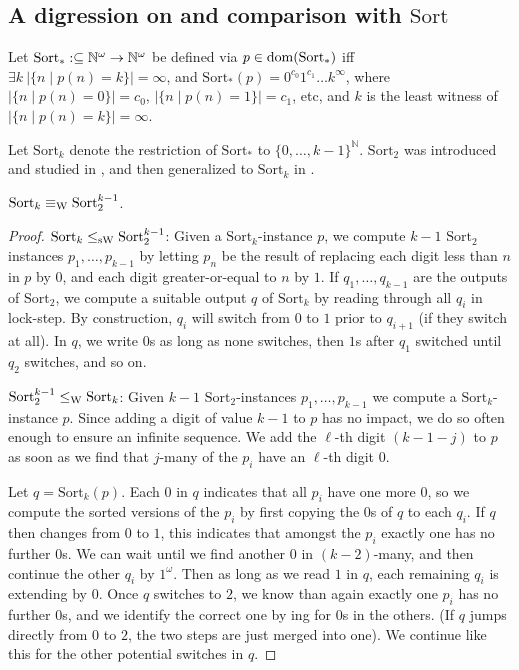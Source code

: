 \documentclass{eptcs-modified}
\begin{document}
\subsection{A digression on and comparison with $\mathrm{Sort}$}
\begin{definition}
Let $\mathrm{Sort}_* : \subseteq {\mathbb{N}^\omega} \to {\mathbb{N}^\omega}$ be defined via $p \in \operatorname{dom}(\mathrm{Sort}_*)$ iff $\exists k \ |\{n \mid p(n) = k\}| = \infty$, and $\mathrm{Sort}_*(p) = 0^{c_0}1^{c_1}\ldots k^\infty$, where $|\{n \mid p(n) = 0\}| = c_0$, $|\{n \mid p(n) = 1\}| = c_1$, etc, and $k$ is the least witness of $|\{n \mid p(n) = k\}| = \infty$.
\end{definition}

Let $\mathrm{Sort}_k$ denote the restriction of $\mathrm{Sort}_*$ to $\{0,\ldots,k-1\}^\mathbb{N}$. $\mathrm{Sort}_2$ was introduced and studied in \cite{paulyneumann}, and then generalized to $\mathrm{Sort}_k$ in \cite{hoelzl2}.

\begin{proposition}
$\mathrm{Sort}_k \equiv_{\textrm{W}} \mathrm{Sort}_2^{k-1}$.
\begin{proof}
$\mathrm{Sort}_k \leq_{\textrm{sW}} \mathrm{Sort}_2^{k-1}$: \quad Given a $\mathrm{Sort}_k$-instance $p$, we compute $k-1$ $\mathrm{Sort}_2$ instances $p_1, \ldots, p_{k-1}$ by letting $p_n$ be the result of replacing each digit less than $n$ in $p$ by $0$, and each digit greater-or-equal to $n$ by $1$. If $q_1,\ldots,q_{k-1}$ are the outputs of $\mathrm{Sort}_2$, we compute a suitable output $q$ of $\mathrm{Sort}_k$ by reading through all $q_i$ in lock-step. By construction, $q_i$ will switch from $0$ to $1$ prior to $q_{i+1}$ (if they switch at all). In $q$, we write $0$s as long as none switches, then $1$s after $q_1$ switched until $q_2$ switches, and so on.

$\mathrm{Sort}_2^{k-1} \leq_{\textrm{W}} \mathrm{Sort}_{k}$: \quad Given $k-1$ $\mathrm{Sort}_2$-instances $p_1, \ldots, p_{k-1}$ we compute a $\mathrm{Sort}_k$-instance $p$. Since adding a digit of value $k-1$ to $p$ has no impact, we do so often enough to ensure an infinite sequence. We add the $\ell$-th digit $(k-1-j)$ to $p$ as soon as we find that $j$-many of the $p_i$ have an $\ell$-th digit $0$.

Let $q = \mathrm{Sort}_k(p)$. Each $0$ in $q$ indicates that all $p_i$ have one more $0$, so we compute the sorted versions of the $p_i$ by first copying the $0$s of $q$ to each $q_i$. If $q$ then changes from $0$ to $1$, this indicates that amongst the $p_i$ exactly one has no further $0$s. We can wait until we find another $0$ in $(k-2)$-many, and then continue the other $q_i$ by $1^\omega$. Then as long as we read $1$ in $q$, each remaining $q_i$ is extending by $0$. Once $q$ switches to $2$, we know than again exactly one $p_i$ has no further $0$s, and we identify the correct one by ing for $0$s in the others. (If $q$ jumps directly from $0$ to $2$, the two steps are just merged into one). We continue like this for the other potential switches in $q$.
\end{proof}
\end{proposition}
\end{document}
